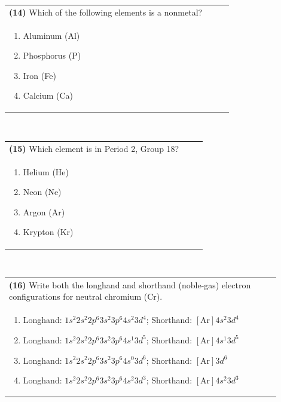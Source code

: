 \documentclass{article}
\begin{document}
\vspace{0.5cm}
\noindent \begin{tabular}{|p{0.9\linewidth}|}
\hline
\vspace{0.2cm}
\textbf{(14)} Which of the following elements is a nonmetal? \\
\begin{minipage}[t]{0.85\linewidth}
\begin{enumerate}[label=\alph*.]
\item Aluminum (Al)
\item Phosphorus (P)
\item Iron (Fe)
\item Calcium (Ca)
\end{enumerate}
\end{minipage}\\
\hline
\end{tabular}
\\

\vspace{0.5cm}
\noindent \begin{tabular}{|p{0.9\linewidth}|}
\hline
\vspace{0.2cm}
\textbf{(15)} Which element is in Period 2, Group 18? \\
\begin{minipage}[t]{0.85\linewidth}
\begin{enumerate}[label=\alph*.]
\item Helium (He)
\item Neon (Ne)
\item Argon (Ar)
\item Krypton (Kr)
\end{enumerate}
\end{minipage}\\
\hline
\end{tabular}
\\

\vspace{0.5cm}
\noindent \begin{tabular}{|p{0.9\linewidth}|}
\hline
\vspace{0.2cm}
\textbf{(16)} Write both the longhand and shorthand (noble-gas) electron configurations for neutral chromium (Cr). \\
\begin{minipage}[t]{0.85\linewidth}
\begin{enumerate}[label=\alph*.]
\item Longhand: $1s^{2}2s^{2}2p^{6}3s^{2}3p^{6}4s^{2}3d^{4}$; Shorthand: $[\text{Ar}]4s^{2}3d^{4}$
\item Longhand: $1s^{2}2s^{2}2p^{6}3s^{2}3p^{6}4s^{1}3d^{5}$; Shorthand: $[\text{Ar}]4s^{1}3d^{5}$
\item Longhand: $1s^{2}2s^{2}2p^{6}3s^{2}3p^{6}4s^{0}3d^{6}$; Shorthand: $[\text{Ar}]3d^{6}$
\item Longhand: $1s^{2}2s^{2}2p^{6}3s^{2}3p^{6}4s^{2}3d^{3}$; Shorthand: $[\text{Ar}]4s^{2}3d^{3}$
\end{enumerate}
\end{minipage}\\
\hline
\end{tabular}
\end{document}
